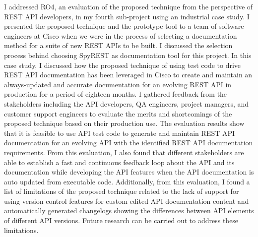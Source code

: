 \documentclass[12pt]{ucalgthes1}
\begin{document}
I addressed RO4, an evaluation of the proposed technique from the perspective of REST API developers, in my fourth sub-project using an industrial case study. I presented the proposed technique and the prototype tool to a team of software engineers at Cisco when we were in the process of selecting a documentation method for a suite of new REST APIs to be built. I discussed the selection process behind choosing SpyREST as documentation tool for this project. In this case study, I discussed how the proposed technique of using test code to drive REST API documentation has been leveraged in Cisco to create and maintain an always-updated and accurate documentation for an evolving REST API in production for a period of eighteen months. I gathered feedback from the stakeholders including the API developers, QA engineers, project managers, and customer support engineers to evaluate the merits and shortcomings of the proposed technique based on their production use. The evaluation results show that it is feasible to use API test code to generate and maintain REST API documentation for an evolving API with the identified REST API documentation requirements. From this evaluation, I also found that different stakeholders are able to establish a fast and continuous feedback loop about the API and its documentation while developing the API features when the API documentation is auto updated from executable code. Additionally, from this evaluation, I found a list of limitations of the proposed technique related to the lack of support for using version control features for custom edited API documentation content and automatically generated changelogs showing the differences between API elements of different API versions. Future research can be carried out to address these limitations.
\end{document}
